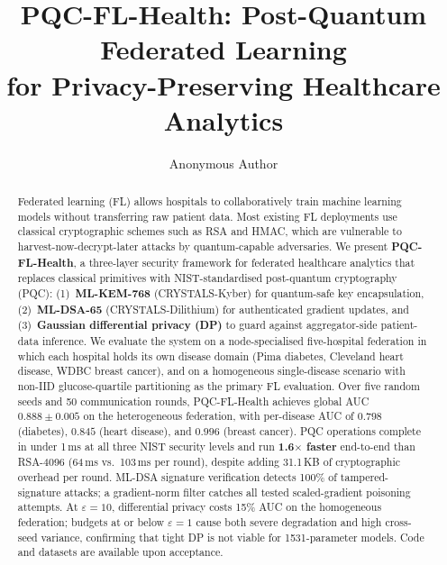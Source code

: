 \documentclass[runningheads]{llncs}
\begin{document}
\title{PQC-FL-Health: Post-Quantum Federated Learning\\
for Privacy-Preserving Healthcare Analytics}

\author{Anonymous Author}

\maketitle

\begin{abstract}
Federated learning (FL) allows hospitals to collaboratively train
machine learning models without transferring raw patient data.
Most existing FL deployments use classical cryptographic schemes such
as RSA and HMAC, which are vulnerable to harvest-now-decrypt-later
attacks by quantum-capable adversaries.
We present \textbf{PQC-FL-Health}, a three-layer security framework
for federated healthcare analytics that replaces classical primitives
with NIST-standardised post-quantum cryptography (PQC):
(1)~\textbf{ML-KEM-768} (CRYSTALS-Kyber) for quantum-safe key
encapsulation, (2)~\textbf{ML-DSA-65} (CRYSTALS-Dilithium) for
authenticated gradient updates, and (3)~\textbf{Gaussian differential
privacy (DP)} to guard against aggregator-side patient-data inference.
We evaluate the system on a node-specialised five-hospital federation
in which each hospital holds its own disease domain
(Pima diabetes, Cleveland heart disease, WDBC breast cancer),
and on a homogeneous single-disease scenario with non-IID
glucose-quartile partitioning as the primary FL evaluation.
Over five random seeds and 50 communication rounds, PQC-FL-Health
achieves global AUC $0.888 \pm 0.005$ on the heterogeneous
federation, with per-disease AUC of $0.798$ (diabetes),
$0.845$ (heart disease), and $0.996$ (breast cancer).
PQC operations complete in under 1\,ms at all three NIST security
levels and run \textbf{1.6$\times$ faster} end-to-end than RSA-4096
(64\,ms vs.\ 103\,ms per round), despite adding 31.1\,KB of
cryptographic overhead per round.
ML-DSA signature verification detects 100\% of tampered-signature
attacks; a gradient-norm filter catches all tested scaled-gradient
poisoning attempts.
At $\varepsilon = 10$, differential privacy costs 15\% AUC on the
homogeneous federation; budgets at or below $\varepsilon = 1$ cause
both severe degradation and high cross-seed variance, confirming that
tight DP is not viable for 1531-parameter models.
Code and datasets are available upon acceptance.
\end{abstract}
\end{document}

